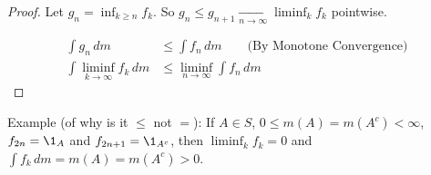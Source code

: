 \begin{proof}
	Let $g_n = \inf_{k \geq n} f_k$. So $g_n \leq g_{n+1} \xrightarrow[n \to \infty]{} \liminf_{k} f_k$ pointwise.

	\begin{align*}
		\int g_n \, dm & \leq \int f_n \, dm \qquad \textrm{(By Monotone Convergence)} \\
		\int \liminf_{k \to \infty} f_k \, dm & \leq \liminf_{n \to \infty} \int f_n \, dm
	\end{align*}
\end{proof}

Example (of why is it $\leq$ not $=$):
If $A \in S$, $0 \leq m(A) = m(A^c) < \infty$, $f_{2n} = \1_A$ and $f_{2n+1} = \1_{A^c}$, then
$\liminf_k f_k = 0$ and $\int f_k \, dm = m(A) = m(A^c) > 0$.
